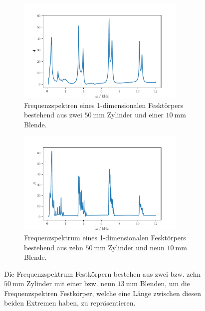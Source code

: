 \begin{figure}
    \begin{subfigure}{0.48\textwidth}%
    \centering%
    \includegraphics[height=5cm]{build/2c1b10.pdf}%
    \caption{Frequenzspektren eines 1-dimensionalen Fesktörpers bestehend aus zwei $\qty{50}{\milli\meter}$ Zylinder und einer $\qty{10}{\milli\meter}$ Blende.}%
    \label{fig:2c1b10}%
    \end{subfigure}%
    \hfill%
    \begin{subfigure}{0.48\textwidth}%
    \centering%
    \includegraphics[height=5cm]{build/10c9b10.pdf}%
    \caption{Frequenzspektrum eines 1-dimensionalen Fesktörpers bestehend aus zehn $\qty{50}{\milli\meter}$ Zylinder und neun $\qty{10}{\milli\meter}$ Blende.}%
    \label{fig:2c1b}%
    \end{subfigure}%
    \caption{Die Frequenzspektrum Festkörpern bestehen aus zwei bzw. zehn $\qty{50}{\milli\meter}$ Zylinder mit einer bzw. neun $\qty{13}{\milli\meter}$ Blenden, um die 
    Frequenzspektren Festkörper, welche eine Länge zwischen diesen beiden Extremen haben, zu repräsentieren.}%
    \label{fig:10mm}
\end{figure}%
